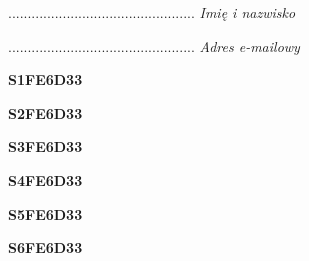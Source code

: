 \begin{turn}{90}\begin{minipage}{\linewidth} \vspace{20mm} ................................................  \textit{Imię i nazwisko}\end{minipage}\end{turn}

\begin{turn}{90}\begin{minipage}{\linewidth} \vspace{20mm} ................................................  \textit{Adres e-mailowy}\end{minipage}\end{turn}

\begin{turn}{90}\huge \begin{minipage}{\linewidth} \vspace{10mm}\textbf{S1FE6D33}\end{minipage}\end{turn}

\begin{turn}{90}\huge \begin{minipage}{\linewidth} \vspace{10mm}\textbf{S2FE6D33}\end{minipage}\end{turn}

\begin{turn}{90}\huge \begin{minipage}{\linewidth} \vspace{10mm}\textbf{S3FE6D33}\end{minipage}\end{turn}

\begin{turn}{90}\huge \begin{minipage}{\linewidth} \vspace{10mm}\textbf{S4FE6D33}\end{minipage}\end{turn}

\begin{turn}{90}\huge \begin{minipage}{\linewidth} \vspace{10mm}\textbf{S5FE6D33}\end{minipage}\end{turn}

\begin{turn}{90}\huge \begin{minipage}{\linewidth} \vspace{10mm}\textbf{S6FE6D33}\end{minipage}\end{turn}

